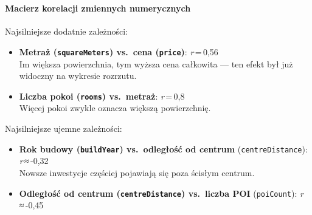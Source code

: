 \documentclass[11pt]{article}
\providecommand{\tightlist}{%
      \setlength{\itemsep}{0pt}\setlength{\parskip}{0pt}}
\begin{document}
    \begin{center}
    \end{center}
    { \hspace*{\fill} \\}
    
    \paragraph{Macierz korelacji zmiennych
numerycznych}\label{macierz-korelacji-zmiennych-numerycznych}

Najsilniejsze dodatnie zależności:

\begin{itemize}
\tightlist
\item
  \textbf{Metraż (\texttt{squareMeters}) vs.~cena (\texttt{price})}:
  \emph{r}\,=\,0,56\\
  Im większa powierzchnia, tym wyższa cena całkowita --- ten efekt był
  już widoczny na wykresie rozrzutu.
\item
  \textbf{Liczba pokoi (\texttt{rooms}) vs.~metraż}: \emph{r}\,=\,0,8\\
  Więcej pokoi zwykle oznacza większą powierzchnię.
\end{itemize}

Najsilniejsze ujemne zależności:

\begin{itemize}
\tightlist
\item
  \textbf{Rok budowy (\texttt{buildYear}) vs.~odległość od centrum}
  (\texttt{centreDistance}): \emph{r}\,≈\,-0,32\\
  Nowsze inwestycje częściej pojawiają się poza ścisłym centrum.
\item
  \textbf{Odległość od centrum (\texttt{centreDistance}) vs.~liczba POI}
  (\texttt{poiCount}): \emph{r}\,≈\,-0,45
\end{itemize}
\end{document}
